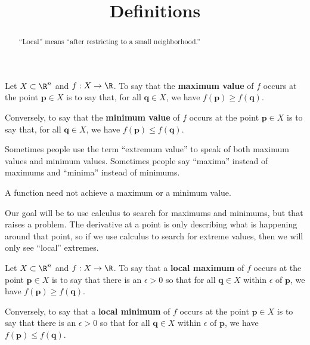 \documentclass{ximera}
\title{Definitions}
\begin{document}
\begin{abstract}
  ``Local'' means ``after restricting to a small neighborhood.''
\end{abstract}\maketitle

\begin{definition}
  Let $X \subset \R^n$ and $f : X \to \R$.  To say that the
  \textbf{maximum value} of $f$ occurs at the point $\mathbf{p} \in X$
  is to say that, for all $\mathbf{q} \in X$, we have $f(\mathbf{p})
  \geq f(\mathbf{q})$.

  Conversely, to say that the \textbf{minimum value} of $f$ occurs at
  the point $\mathbf{p} \in X$ is to say that, for all $\mathbf{q} \in
  X$, we have $f(\mathbf{p}) \leq f(\mathbf{q})$.

  Sometimes people use the term ``extremum value'' to speak of both
  maximum values and minimum values.  Sometimes people say ``maxima''
  instead of maximums and ``minima'' instead of minimums.
\end{definition}

A function need not achieve a maximum or a minimum value.

Our goal will be to use calculus to search for maximums and minimums,
but that raises a problem.  The derivative at a point is only
describing what is happening around that point, so if we use calculus
to search for extreme values, then we will only see ``local''
extremes.

\begin{definition}
  Let $X \subset \R^n$ and $f : X \to \R$.  To say that a
  \textbf{local maximum} of $f$ occurs at the point $\mathbf{p} \in X$
  is to say that there is an $\epsilon > 0$ so that for all
  $\mathbf{q} \in X$ within $\epsilon$ of $\mathbf{p}$, we have
  $f(\mathbf{p}) \geq f(\mathbf{q})$.

  Conversely, to say that a \textbf{local minimum} of $f$ occurs at
  the point $\mathbf{p} \in X$ is to say that there is an $\epsilon >
  0$ so that for all $\mathbf{q} \in X$ within $\epsilon$ of
  $\mathbf{p}$, we have $f(\mathbf{p}) \leq f(\mathbf{q})$.
\end{definition}
\end{document}
